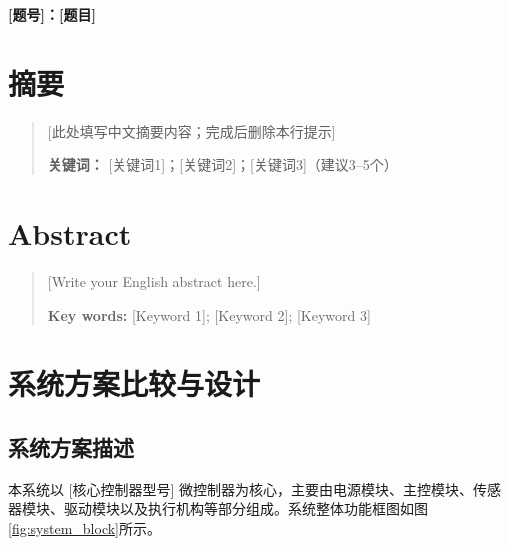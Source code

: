 \documentclass[UTF8,zihao=-4]{ctexart}
\begin{document}
\begin{center}
    \huge \bfseries [题号]：[题目]
    \vspace{1cm}
\end{center}

\section*{摘要}
\begin{quote}
    \noindent
    [此处填写中文摘要内容；完成后删除本行提示]

    \vspace{0.6cm}
    \noindent
    \textbf{关键词：} [关键词1]；[关键词2]；[关键词3]（建议3--5个）
\end{quote}

\section*{Abstract}
\begin{quote}
    \noindent
    [Write your English abstract here.]

    \vspace{0.6cm}
    \noindent
    \textbf{Key words:} [Keyword 1]; [Keyword 2]; [Keyword 3]
\end{quote}

\newpage
\tableofcontents
\newpage


\section{系统方案比较与设计}
\subsection{系统方案描述}
    本系统以 [核心控制器型号] 微控制器为核心，主要由电源模块、主控模块、传感器模块、驱动模块以及执行机构等部分组成。系统整体功能框图如图\ref{fig:system_block}所示。
    
\end{document}

